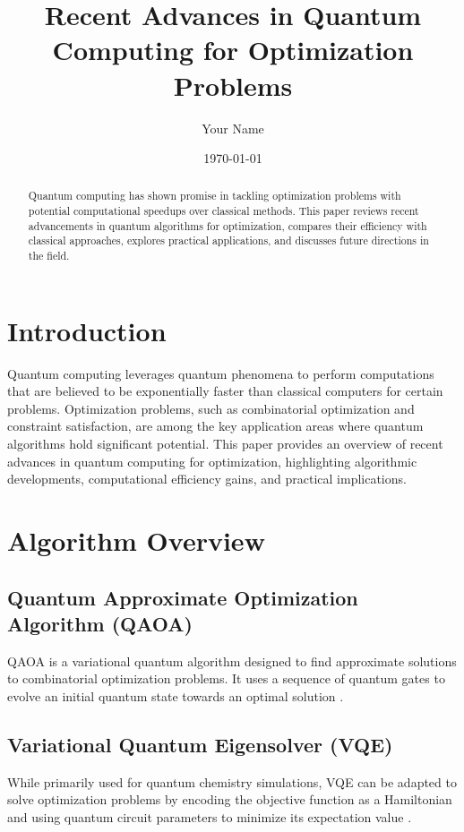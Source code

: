 \documentclass[12pt]{article}
\title{Recent Advances in Quantum Computing for Optimization Problems}
\author{Your Name}
\date{\today}
\begin{document}
\maketitle

\begin{abstract}
Quantum computing has shown promise in tackling optimization problems with potential computational speedups over classical methods. This paper reviews recent advancements in quantum algorithms for optimization, compares their efficiency with classical approaches, explores practical applications, and discusses future directions in the field.
\end{abstract}

\section{Introduction}
Quantum computing leverages quantum phenomena to perform computations that are believed to be exponentially faster than classical computers for certain problems. Optimization problems, such as combinatorial optimization and constraint satisfaction, are among the key application areas where quantum algorithms hold significant potential. This paper provides an overview of recent advances in quantum computing for optimization, highlighting algorithmic developments, computational efficiency gains, and practical implications.

\section{Algorithm Overview}
\subsection{Quantum Approximate Optimization Algorithm (QAOA)}
QAOA is a variational quantum algorithm designed to find approximate solutions to combinatorial optimization problems. It uses a sequence of quantum gates to evolve an initial quantum state towards an optimal solution \citep{farhi2014quantum, hadfield2019quantum}.

\subsection{Variational Quantum Eigensolver (VQE)}
While primarily used for quantum chemistry simulations, VQE can be adapted to solve optimization problems by encoding the objective function as a Hamiltonian and using quantum circuit parameters to minimize its expectation value \citep{peruzzo2014variational, kandala2017hardware}.
\end{document}
